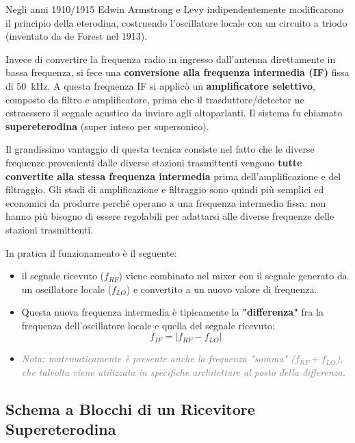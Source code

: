 \documentclass[openany,a4paper,12pt]{book}
\begin{document}
Negli anni 1910/1915 Edwin Armstrong e Levy indipendentemente modificarono il principio della eterodina, costruendo l'oscillatore locale con un circuito a triodo (inventato da de Forest nel 1913). 

Invece di convertire la frequenza radio in ingresso dall'antenna direttamente in bassa frequenza, si fece una \textbf{conversione alla frequenza intermedia (IF)} fissa di \qty{50}{\kilo\hertz}. 
A questa frequenza IF si applicò un \textbf{amplificatore selettivo}, composto da filtro e amplificatore, prima che il trasduttore/detector ne estraessero il segnale acustico da inviare agli altoparlanti. Il sistema fu chiamato \textbf{supereterodina} (super inteso per supersonico).

\begin{nota}
    Il grandissimo vantaggio di questa tecnica consiste nel fatto che le diverse frequenze provenienti dalle diverse stazioni trasmittenti vengono \textbf{tutte convertite alla stessa frequenza intermedia} prima dell'amplificazione e del filtraggio. Gli stadi di amplificazione e filtraggio sono quindi più semplici ed economici da produrre perché operano a una frequenza intermedia fissa: non hanno più bisogno di essere regolabili per adattarsi alle diverse frequenze delle stazioni trasmittenti.
\end{nota}

In pratica il funzionamento è il seguente:
\begin{itemize}[label=\textcolor{PoliBlue}{\textbullet}]
    \item il segnale ricevuto (\(f_{RF}\)) viene combinato nel mixer con il segnale generato da un oscillatore locale (\(f_{LO}\)) e convertito a un nuovo valore di frequenza. 
    \item Questa nuova frequenza intermedia è tipicamente la \textbf{"differenza"} fra la frequenza dell'oscillatore locale e quella del segnale ricevuto:
    \begin{equation}
        f_{IF} = | f_{RF} - f_{LO} |
    \end{equation}
    \item \textcolor{gray}{\textit{Nota: matematicamente è presente anche la frequenza "somma" ($f_{RF} + f_{LO}$), che talvolta viene utilizzata in specifiche architetture al posto della differenza.}}
\end{itemize}


\subsection*{Schema a Blocchi di un Ricevitore Supereterodina}
\end{document}

